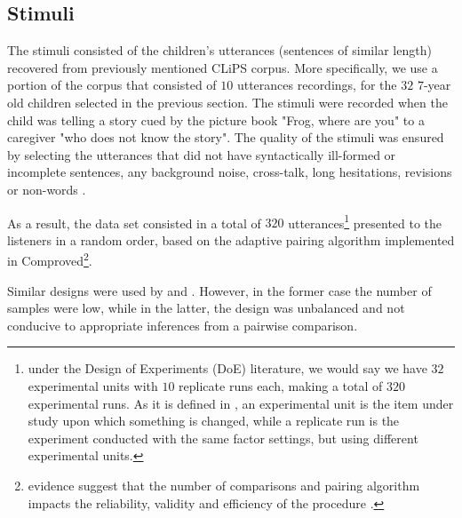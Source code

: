 \begin{comment}
\textbf{for the experimenter:} Based on \citet{Faes_et_al_2021} we depict the procedure for the experimenter:
%
\begin{enumerate}
	\item 1. matching procedure 
	\item selection of suitable stimuli
	\item determine the number of stimuli per judge 
	\item 
\end{enumerate}	
\end{comment}
%
%
\subsection{Stimuli} \label{s_sect:stimuli}
%
The stimuli consisted of the children's utterances (sentences of similar length) recovered from previously mentioned CLiPS corpus. More specifically, we use a portion of the corpus that consisted of $10$ utterances recordings, for the $32$ $7$-year old children selected in the previous section. The stimuli were recorded when the child was telling a story cued by the picture book "Frog, where are you" \citep{Mayer_1969} to a caregiver "who does not know the story". The quality of the stimuli was ensured by selecting the utterances that did not have syntactically ill-formed or incomplete sentences, any background noise, cross-talk, long hesitations, revisions or non-words \citep{Boonen_et_al_2021}. 

As a result, the data set consisted in a total of $320$ utterances\footnote{under the Design of Experiments (DoE) literature, we would say we have $32$ experimental units with $10$ replicate runs each, making a total of $320$ experimental runs. As it is defined in \citet{Lawson_2015}, an experimental unit is the item under study upon which something is changed, while a replicate run is the experiment conducted with the same factor settings, but using different experimental units.} presented to the listeners in a random order, based on the adaptive pairing algorithm \citep{Pollitt_2012b} implemented in Comproved\footnote{evidence suggest that the number of comparisons and pairing algorithm impacts the reliability, validity and efficiency of the procedure \citep{Bramley_2015, Bramley_et_al_2018, Lesterhuis_2018, Verhavert_et_al_2019}.}.

Similar designs were used by \citet{Boonen_et_al_2020} and \citet{Faes_et_al_2021}. However, in the former case the number of samples were low, while in the latter, the design was unbalanced and not conducive to appropriate inferences from a pairwise comparison.
%
%
